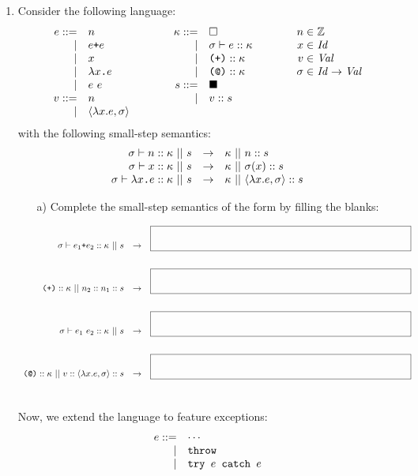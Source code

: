\begin{enumerate}
\item Consider the following language:
\[
\begin{array}{rllrllr@{\hskip3pt}l}
e::= & n &\qquad& \kappa ::= & \square
&\qquad& n\in & \mathbb{Z} \\
\mid& e\verb!+!e &&\mid&\sigma\vdash e::\kappa
&& x\in & \mathit{Id} \\
\mid& x &&\mid&\verb!(+)!::\kappa
&& v\in & \mathit{Val} \\
\mid& \lambda x\verb+.+e &\qquad&\mid&\verb!(@)!::\kappa
&& \sigma\in & \mathit{Id}\rightarrow\mathit{Val} \\
\mid& e\ e &&s::=& \blacksquare \\
v::=& n &&\mid&v::s\\
\mid& \langle \lambda x.e, \sigma \rangle\\
\end{array}
\]
with the following small-step semantics:
\[
\begin{array}{rcl}
\sigma\vdash n::\kappa\ ||\ s&\rightarrow&\kappa\ ||\ n::s \\
\sigma\vdash x::\kappa\ ||\ s&\rightarrow&\kappa\ ||\ \sigma(x)::s \\
\sigma\vdash \lambda x\code{.}e::\kappa\ ||\ s
&\rightarrow&\kappa\ ||\ \langle\lambda x.e,\sigma\rangle::s \\
\end{array}
\]

\begin{itemize}
\item[a)] Complete the small-step semantics
of the form 
by filling the blanks:
\end{itemize}

\[
\begin{array}{rcl}
\sigma\vdash e_1\code{+}e_2::\kappa\ ||\ s
&\rightarrow& \mblank\\[20pt]
\code{(+)}::\kappa\ ||\ n_2::n_1::s
&\rightarrow& \mblank\\[20pt]
\sigma\vdash e_1\ e_2::\kappa\ ||\ s
&\rightarrow& \mblank\\[20pt]
\code{(@)}::\kappa\ ||\ v::\langle\lambda x.e,\sigma\rangle::s
&\rightarrow& \mblank\\[20pt]
\end{array}
\]

Now, we extend the language to feature exceptions:
\[
\begin{array}{rl}
e::= & \cdots \\
\mid&\verb+throw+ \\
\mid&\verb+try +e\verb+ catch +e \\
\end{array}
\]


\end{enumerate}

